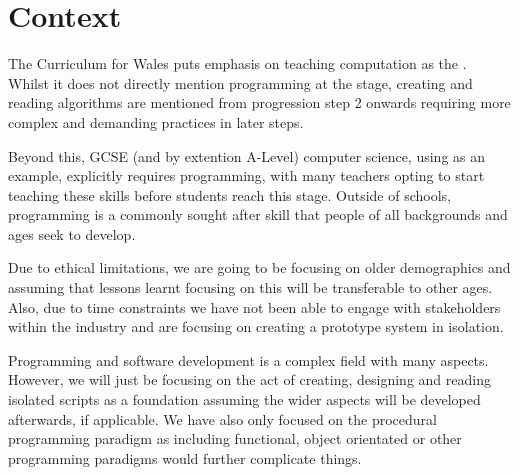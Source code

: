 %


\section{Context}\label{sec:background/context}

The Curriculum for Wales puts emphasis on teaching computation as the  \citep{WelshCurriculum-Tech-Descriptions}. Whilst it does not directly mention programming at the stage, creating and reading algorithms are mentioned from progression step 2 onwards requiring more complex and demanding practices in later steps.

Beyond this, GCSE (and by extention A-Level) computer science, using as \citet{AQA-CompSci} an example, explicitly requires programming, with many teachers opting to start teaching these skills before students reach this stage. Outside of schools, programming is a commonly sought after skill that people of all backgrounds and ages seek to develop.

Due to ethical limitations, we are going to be focusing on older demographics and assuming that lessons learnt focusing on this will be transferable to other ages. Also, due to time constraints we have not been able to engage with stakeholders within the industry and are focusing on creating a prototype system in isolation.

Programming and software development is a complex field with many aspects. However, we will just be focusing on the act of creating, designing and reading isolated scripts as a foundation assuming the wider aspects will be developed afterwards, if applicable. We have also only focused on the procedural programming paradigm as including functional, object orientated or other programming paradigms would further complicate things.

